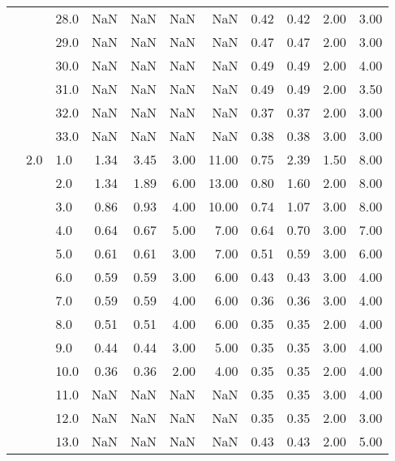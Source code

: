 \begin{tabular}{lllrrrrrrrr}
      &     & 28.0 &        NaN &       NaN &  NaN &    NaN &       0.42 &      0.42 & 2.00 &   3.00 \\
      &     & 29.0 &        NaN &       NaN &  NaN &    NaN &       0.47 &      0.47 & 2.00 &   3.00 \\
      &     & 30.0 &        NaN &       NaN &  NaN &    NaN &       0.49 &      0.49 & 2.00 &   4.00 \\
      &     & 31.0 &        NaN &       NaN &  NaN &    NaN &       0.49 &      0.49 & 2.00 &   3.50 \\
      &     & 32.0 &        NaN &       NaN &  NaN &    NaN &       0.37 &      0.37 & 2.00 &   3.00 \\
      &     & 33.0 &        NaN &       NaN &  NaN &    NaN &       0.38 &      0.38 & 3.00 &   3.00 \\
      & 2.0 & 1.0  &       1.34 &      3.45 & 3.00 &  11.00 &       0.75 &      2.39 & 1.50 &   8.00 \\
      &     & 2.0  &       1.34 &      1.89 & 6.00 &  13.00 &       0.80 &      1.60 & 2.00 &   8.00 \\
      &     & 3.0  &       0.86 &      0.93 & 4.00 &  10.00 &       0.74 &      1.07 & 3.00 &   8.00 \\
      &     & 4.0  &       0.64 &      0.67 & 5.00 &   7.00 &       0.64 &      0.70 & 3.00 &   7.00 \\
      &     & 5.0  &       0.61 &      0.61 & 3.00 &   7.00 &       0.51 &      0.59 & 3.00 &   6.00 \\
      &     & 6.0  &       0.59 &      0.59 & 3.00 &   6.00 &       0.43 &      0.43 & 3.00 &   4.00 \\
      &     & 7.0  &       0.59 &      0.59 & 4.00 &   6.00 &       0.36 &      0.36 & 3.00 &   4.00 \\
      &     & 8.0  &       0.51 &      0.51 & 4.00 &   6.00 &       0.35 &      0.35 & 2.00 &   4.00 \\
      &     & 9.0  &       0.44 &      0.44 & 3.00 &   5.00 &       0.35 &      0.35 & 3.00 &   4.00 \\
      &     & 10.0 &       0.36 &      0.36 & 2.00 &   4.00 &       0.35 &      0.35 & 2.00 &   4.00 \\
      &     & 11.0 &        NaN &       NaN &  NaN &    NaN &       0.35 &      0.35 & 3.00 &   4.00 \\
      &     & 12.0 &        NaN &       NaN &  NaN &    NaN &       0.35 &      0.35 & 2.00 &   3.00 \\
      &     & 13.0 &        NaN &       NaN &  NaN &    NaN &       0.43 &      0.43 & 2.00 &   5.00 \\

\end{tabular}
